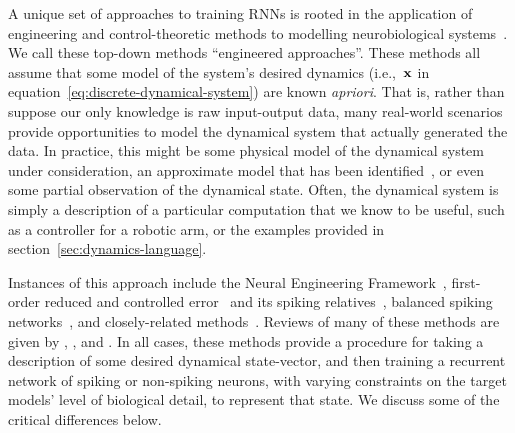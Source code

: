 A unique set of approaches to training RNNs is rooted in the application of engineering and control-theoretic methods to modelling neurobiological systems~\citep{eliasmith1999developing}.
We call these top-down methods ``engineered approaches''.
These methods all assume that some model of the system's desired dynamics (i.e.,~$\mathbf{x}$ in equation~\ref{eq:discrete-dynamical-system}) are known \emph{apriori}.
That is, rather than suppose our only knowledge is raw input-output data, many real-world scenarios provide opportunities to model the dynamical system that actually generated the data.
In practice, this might be some physical model of the dynamical system under consideration, an approximate model that has been identified~\citep{nelles2013nonlinear}, or even some partial observation of the dynamical state.
Often, the dynamical system is simply a description of a particular computation that we know to be useful, such as a controller for a robotic arm, or the examples provided in section~\ref{sec:dynamics-language}.

Instances of this approach include the Neural Engineering Framework~\citep[NEF;][]{eliasmith2003a, duggins2017incorporating}, first-order reduced and controlled error~\citep[FORCE;][]{sussillo2009generating, depasquale2018full} and its spiking relatives~\citep{thalmeier2016learning, depasquale2016using}, balanced spiking networks~\citep{boerlin2011spike, boerlin2013predictive, schwemmer2015constructing, alemi2018learning}, and closely-related methods~\citep{jaeger2014controlling, gilra2017predicting}.
Reviews of many of these methods are given by \citet{deneve2016efficient}, \citet{abbott2016building}, and \citet{nicola2016supervised}.
In all cases, these methods provide a procedure for taking a description of some desired dynamical state-vector, and then training a recurrent network of spiking or non-spiking neurons, with varying constraints on the target models' level of biological detail, to represent that state.
We discuss some of the critical differences below.


